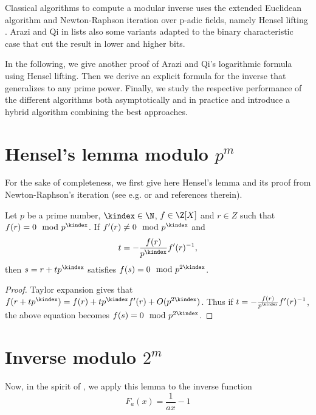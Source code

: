 Classical algorithms to compute a modular inverse uses the
extended Euclidean algorithm and Newton-Raphson iteration over p-adic fields, namely Hensel lifting \cite{Krishnamurthy:1983:padic}.
Arazi and Qi in \cite{Arazi:2008:CMI} lists also some variants adapted to the binary characteristic case that cut the result in lower and higher bits.

In the following, we give another proof of Arazi and Qi's logarithmic formula
using Hensel lifting. 
Then we derive an explicit formula for the inverse that generalizes to any prime
power. Finally, we study the respective performance of the different algorithms
both asymptotically and in practice and introduce a hybrid algorithm combining
the best approaches. 

\section{Hensel's lemma modulo \texorpdfstring{$p^{m}$}{p{\textasciicircum}m}}
For the sake of completeness, we first give here Hensel's lemma and
its proof from Newton-Raphson's iteration (see
e.g. \cite[Theorem 7.7.1]{Bach:1996:ANTEA} or \cite[\S 4.2]{Brent:2011:MCA} and
references therein). 
\begin{lemma}[Hensel]\label{lem:hensel} 
Let $p$ be a prime number, $\kindex \in \N$, $f \in \Z[X]$ and $r \in Z$
such that $f(r) = 0 \mod p^\kindex$. If $f'(r)\neq 0 \mod p^\kindex$ and $$t=-\frac{f(r)}{p^\kindex}f'(r)^{-1},$$ then
$s=r+tp^\kindex$ satisfies $f(s)=0 \mod p^{2\kindex}$.
\end{lemma}
\begin{proof}
Taylor expansion gives that
$f(r+tp^\kindex)=f(r)+tp^\kindex f'(r)+O(p^{2\kindex})$. Thus if
$t=-\frac{f(r)}{p^\kindex}f'(r)^{-1} $, 
the above equation becomes $f(s)=0 \mod p^{2\kindex}$.
\end{proof}

\section{Inverse modulo \texorpdfstring{$2^m$}{2{\textasciicircum}m}}
Now, in the spirit of \cite{Xenophontos:2010:fixed}, we apply this lemma to the
inverse function 
\begin{equation}\label{eq:invfun}
F_a(x)=\frac{1}{ax}-1
\end{equation}

